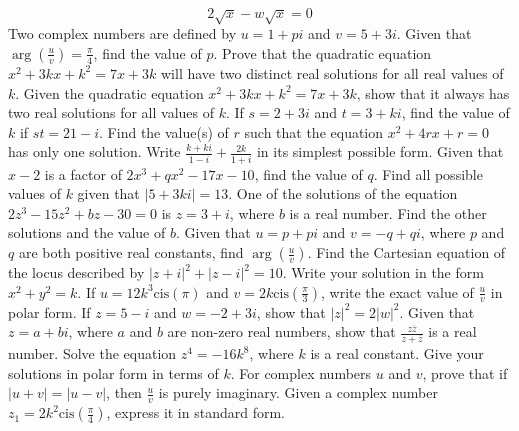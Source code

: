 \documentclass[12pt,addpoints]{exam}
\begin{document}
\begin{questions}
\[ 2\sqrt{x} - w\sqrt{x} = 0 \]
\fillwithlines{3cm}
\question[5] Two complex numbers are defined by \( u = 1 + pi \) and \( v = 5 + 3i \). Given that \( \arg \left( \frac{u}{v} \right) = \frac{\pi}{4} \), find the value of \( p \).
\fillwithlines{3cm}
\question[5] Prove that the quadratic equation \(x^2 + 3kx + k^2 = 7x + 3k\) will have two distinct real solutions for all real values of \(k\).
\fillwithlines{3cm}
\question[5] Given the quadratic equation \( x^2 + 3kx + k^2 = 7x + 3k \), show that it always has two real solutions for all values of \( k \).
\fillwithlines{3cm}
\question[5] If \( s = 2 + 3i \) and \( t = 3 + ki \), find the value of \( k \) if \( st = 21 - i \).
\fillwithlines{3cm}
\question[5] Find the value(s) of \( r \) such that the equation \( x^2 + 4rx + r = 0 \) has only one solution.
\fillwithlines{3cm}
\question[5] Write \(\frac{k + ki}{1 - i} + \frac{2k}{1 + i}\) in its simplest possible form.
\fillwithlines{3cm}
\question[5] Given that \(x - 2\) is a factor of \(2x^3 + qx^2 - 17x - 10\), find the value of \(q\).
\fillwithlines{3cm}
\question[5] Find all possible values of \( k \) given that \(|5 + 3ki| = 13\).
\fillwithlines{3cm}
\question[5] One of the solutions of the equation \(2z^3 - 15z^2 + bz - 30 = 0\) is \(z = 3 + i\), where \(b\) is a real number. Find the other solutions and the value of \(b\).
\fillwithlines{3cm}
\question[5] Given that \( u = p + pi \) and \( v = -q + qi \), where \( p \) and \( q \) are both positive real constants, find \( \arg \left( \frac{u}{v} \right) \).
\fillwithlines{3cm}
\question[5] Find the Cartesian equation of the locus described by \( |z + i|^2 + |z - i|^2 = 10 \). Write your solution in the form \( x^2 + y^2 = k \).
\fillwithlines{3cm}
\question[5] If \( u = 12k^3 \text{cis}(\pi) \) and \( v = 2k \text{cis} \left( \frac{\pi}{3} \right) \), write the exact value of \( \frac{u}{v} \) in polar form.
\fillwithlines{3cm}
\question[5] If \( z = 5 - i \) and \( w = -2 + 3i \), show that \( |z|^2 = 2|w|^2 \).
\fillwithlines{3cm}
\question[5] Given that \( z = a + bi \), where \( a \) and \( b \) are non-zero real numbers, show that \(\frac{z \overline{z}}{z + \overline{z}}\) is a real number.
\fillwithlines{3cm}
\question[5] Solve the equation \( z^4 = -16k^8 \), where \( k \) is a real constant. Give your solutions in polar form in terms of \( k \).
\fillwithlines{3cm}
\question[5] For complex numbers \( u \) and \( v \), prove that if \( |u + v| = |u - v| \), then \( \frac{u}{v} \) is purely imaginary.
\fillwithlines{3cm}
\question[5] Given a complex number \( z_1 = 2k^2 \text{cis} \left( \frac{\pi}{4} \right) \), express it in standard form.

\end{questions}
\end{document}
